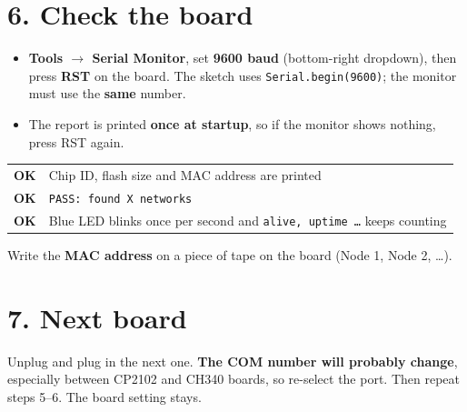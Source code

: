 \documentclass[11pt]{article}
\newcommand{\menu}[1]{\textbf{#1}}
\newcommand{\ok}{\textcolor{green!50!black}{\textbf{OK}}}
\begin{document}
\section*{6. Check the board}
\begin{itemize}
\item \menu{Tools $\rightarrow$ Serial Monitor}, set \textbf{9600 baud} (bottom-right dropdown), then press \textbf{RST} on the board.
The sketch uses \texttt{Serial.begin(9600)}; the monitor must use the \textbf{same} number.
\item The report is printed \textbf{once at startup}, so if the monitor shows nothing, press RST again.
\end{itemize}
\begin{tabular}{@{}l l@{}}
\ok & Chip ID, flash size and MAC address are printed \\
\ok & \texttt{PASS: found X networks} \\
\ok & Blue LED blinks once per second and \texttt{alive, uptime \dots} keeps counting \\
\end{tabular}

Write the \textbf{MAC address} on a piece of tape on the board (Node 1, Node 2, \dots).

\section*{7. Next board}
Unplug and plug in the next one. \textbf{The COM number will probably change}, especially between CP2102 and CH340 boards, so re-select the port. Then repeat steps 5--6. The board setting stays.
\end{document}
